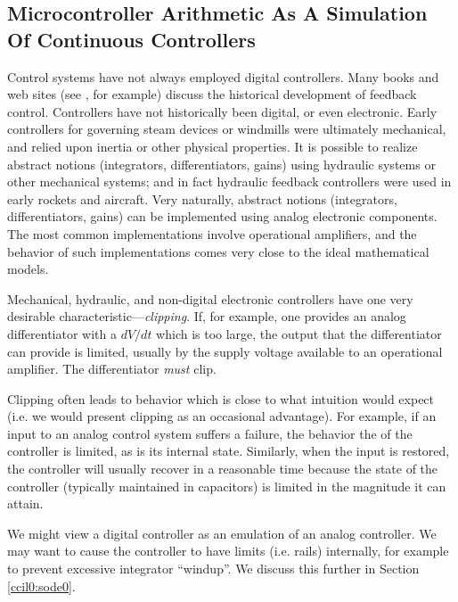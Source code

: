\subsection{Microcontroller Arithmetic As A Simulation Of Continuous Controllers}
\label{ccil0:sppm0:smae0}

Control systems have not always employed digital controllers.
Many books and web sites (see \cite{bibref:w:historycontrol01}, for example)
discuss the historical development of feedback control.  Controllers
have not historically been digital, or even electronic.
Early controllers for governing steam devices or windmills were
ultimately mechanical, and relied upon inertia or other physical
properties.  It is possible to realize abstract notions
(integrators, differentiators, gains) using hydraulic systems or other mechanical systems;
and in fact hydraulic feedback controllers were used in early rockets
and aircraft.  Very naturally, abstract notions (integrators,
differentiators, gains) can be implemented using analog
electronic components.  The most common implementations involve
operational amplifiers, and the behavior of such implementations comes
very close to the ideal mathematical models.

Mechanical, hydraulic, and non-digital electronic controllers have
one very desirable characteristic---\emph{clipping}.  If, for example,
one provides an analog differentiator with a $dV/dt$ which
is too large, the output that the differentiator can 
provide is limited, usually by the supply voltage available to an operational
amplifier.
The differentiator \emph{must} clip.

Clipping often leads to behavior which is close to what
intuition would expect (i.e. we would present 
clipping as an occasional advantage).  For example, if an input to
an analog control system suffers a failure, the behavior
the of the controller is limited, as is its internal
state.  Similarly, when the
input is restored, the controller will usually recover 
in a reasonable time because the
state of the controller (typically maintained in capacitors) is limited
in the magnitude it can attain.

We might view a digital controller as an emulation of
an analog controller.  We may want to cause the
controller to have limits (i.e. rails) internally, for
example to prevent excessive integrator ``windup''.  We discuss
this further in Section \ref{ccil0:sode0}.


